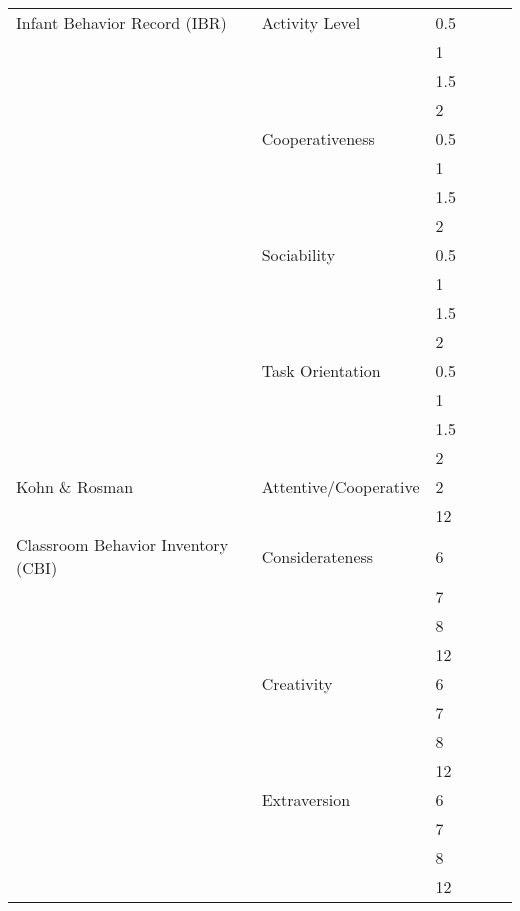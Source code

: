 \begin{center}
\begin{ThreePartTable}
\begin{longtable}{L{4cm} L{5cm} C{1cm} C{1cm} C{1.2cm} C{1.5cm}}
Infant Behavior Record (IBR)	&	Activity Level	&	0.5	&	\checkmark	&	\checkmark	&		\\
&	&	1	&	\checkmark	&	\checkmark	&		\\
&	&	1.5	&	\checkmark	&	\checkmark	&		\\
&	&	2	&	\checkmark	&	\checkmark	&		\\
						&	Cooperativeness	&	0.5	&		&	\checkmark	&		\\
&	&	1	&	&	\checkmark	&		\\
&	&	1.5	&	&	\checkmark	&		\\
&	&	2	&	&	\checkmark	&		\\
						&	Sociability		&	0.5	&	\checkmark	&	\checkmark	&		\\
&	&	1	&	\checkmark	&	\checkmark	&		\\
&	&	1.5	&	\checkmark	&	\checkmark	&		\\
&	&	2	&	\checkmark	&		&		\\
						&	Task Orientation &	0.5	&	\checkmark	&	\checkmark	&		\\
&	&	1	&	\checkmark	&	\checkmark	&		\\
&	&	1.5	&	\checkmark	&	\checkmark	&		\\
&	&	2	&	\checkmark	&	\checkmark	&		\\
Kohn \& Rosman 			& 	Attentive/Cooperative & 2 & 
\checkmark	&	\checkmark	&		\\
						& & 12 & \checkmark	&	\checkmark	&		\\
Classroom Behavior Inventory (CBI) & Considerateness & 6 &
\checkmark	&	\checkmark	&		\\
									& 				& 7 &
\checkmark	&	\checkmark	&		\\
									& 				& 8 &
\checkmark	&	\checkmark	&		\\
									& 				& 12 &
\checkmark	&	\checkmark	&		\\
								  & Creativity & 6 &
\checkmark	&	\checkmark	&		\\
									& 				& 7 &
\checkmark	&	\checkmark	&		\\
									& 				& 8 &
\checkmark	&	\checkmark	&		\\
									& 				& 12 &
\checkmark	&	\checkmark	&		\\
								& Extraversion & 6 &
\checkmark	&	\checkmark	&		\\
									& 				& 7 &
\checkmark	&	\checkmark	&		\\
									& 				& 8 &
\checkmark	&	\checkmark	&		\\
									& 				& 12 &

\end{longtable}
\end{ThreePartTable}
\end{center}
